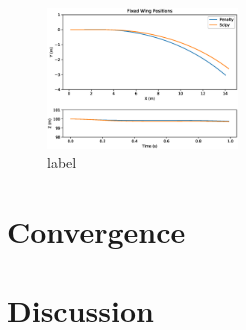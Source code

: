 \documentclass{article}
\begin{document}
\begin{figure}[htbp]
	\centering
	\includegraphics[width=0.45\textwidth]{figures/positions2.eps}
	\caption{label}
	\label{fig:commanded_dir2}
\end{figure}




\section*{Convergence}







\section*{Discussion}
\end{document}
